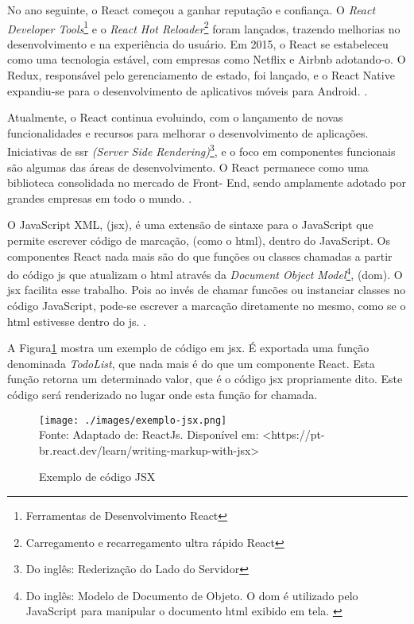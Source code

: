 No ano seguinte, o React começou a ganhar reputação e confiança. O
\textit{React Developer Tools}\footnote{Ferramentas de Desenvolvimento React
}
e o
\textit{React Hot Reloader}\footnote{Carregamento e recarregamento ultra rápido React
}
foram lançados, trazendo melhorias no
desenvolvimento e na experiência do usuário. Em 2015, o React se estabeleceu como uma
tecnologia estável, com empresas como Netflix e Airbnb adotando-o. O Redux, responsável
pelo gerenciamento de estado, foi lançado, e o React Native expandiu-se para o
desenvolvimento de aplicativos móveis para Android.
\cite{morais-react}.

Atualmente, o React continua evoluindo, com o lançamento de novas
funcionalidades e recursos para melhorar o desenvolvimento de aplicações. Iniciativas de
\acrshort{ssr}
\textit{(Server Side Rendering)}\footnote{Do inglês: Rederização do Lado do Servidor
}, e o foco em componentes funcionais são algumas das áreas de
desenvolvimento. O React permanece como uma biblioteca consolidada no mercado de Front-
End, sendo amplamente adotado por grandes empresas em todo o mundo.
\cite{morais-react}.


O JavaScript XML, (\acrshort{jsx}),
é uma extensão de sintaxe para o JavaScript que permite escrever
código de marcação, (como o \acrshort{html}),
dentro do JavaScript. Os componentes React nada mais são do que
funções ou classes chamadas a partir do código
\acrshort{js}
que atualizam o
\acrshort{html}
através da
\textit{Document Object Model}\footnote{Do inglês: Modelo de Documento de Objeto. O
    \acrshort{dom}
    é utilizado pelo JavaScript para manipular o documento
    \acrshort{html}
    exibido em tela.
    \cite{alura-dom}
 },
(\acrshort{dom}).
O
\acrshort{jsx}
facilita esse trabalho. Pois ao invés de chamar
funcões ou instanciar classes no código JavaScript,
pode-se escrever a marcação diretamente no mesmo,
como se o 
\acrshort{html}
estivesse dentro do
\acrshort{js}.
\cite{react-jsx}.

A
Figura\ref{fig:exemplo-jsx}
mostra um exemplo de código em
\acrshort{jsx}.
É exportada uma função denominada \textit{TodoList},
que nada mais é do que um componente React.
Esta função retorna um determinado valor, que é
o código
\acrshort{jsx}
propriamente dito. Este código será renderizado
no lugar onde esta função for chamada.

\begin{figure}[H]
    \centering
    \caption{Exemplo de código JSX}
    \texttt{[image: ./images/exemplo-jsx.png]}
    \label{fig:exemplo-jsx} \\
    \textnormal{\fontsize{10pt}{12pt}Fonte: Adaptado de: ReactJs. Disponível em: <https://pt-br.react.dev/learn/writing-markup-with-jsx>}
\end{figure}

